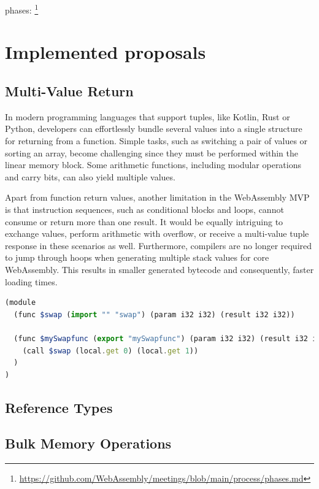 phases: \footnote{\url{https://github.com/WebAssembly/meetings/blob/main/process/phases.md}}

\section{Implemented proposals}
\label{sec:implemented-proposals}

\subsection{Multi-Value Return}
In modern programming languages that support tuples, like Kotlin, Rust or Python, developers can effortlessly bundle several values into a single structure for returning from a function. Simple tasks, such as switching a pair of values or sorting an array, become challenging since they must be performed within the linear memory block. Some arithmetic functions, including modular operations and carry bits, can also yield multiple values.

Apart from function return values, another limitation in the WebAssembly MVP is that instruction sequences, such as conditional blocks and loops, cannot consume or return more than one result. It would be equally intriguing to exchange values, perform arithmetic with overflow, or receive a multi-value tuple response in these scenarios as well. Furthermore, compilers are no longer required to jump through hoops when generating multiple stack values for core WebAssembly. This results in smaller generated bytecode and consequently, faster loading times.

\begin{lstlisting}[frame=lines, caption=Simple swap function that evaluates the multi return proposal, captionpos=b, language=JavaScript, showstringspaces=false]
(module
  (func $swap (import "" "swap") (param i32 i32) (result i32 i32))

  (func $mySwapfunc (export "mySwapfunc") (param i32 i32) (result i32 i32)
    (call $swap (local.get 0) (local.get 1))
  )
)
\end{lstlisting}

\subsection{Reference Types}

\subsection{Bulk Memory Operations}


